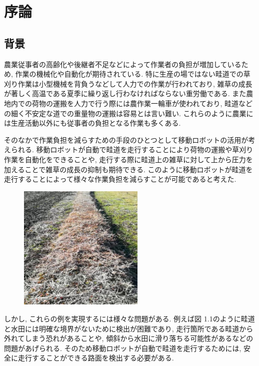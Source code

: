 \chapter{序論}
\section{背景}
農業従事者の高齢化や後継者不足などによって作業者の負担が増加しているため, 作業の機械化や自動化が期待されている. 
特に生産の場ではない畦道での草刈り作業は小型機械を背負うなどして人力での作業が行われており, 雑草の成長が著しく高温である夏季に繰り返し行わなければならない重労働である. 
また農地内での荷物の運搬を人力で行う際には農作業一輪車が使われており, 畦道などの細く不安定な道での重量物の運搬は容易とは言い難い. 
これらのように農業には生産活動以外にも従事者の負担となる作業も多くある.  

そのなかで作業負担を減らすための手段のひとつとして移動ロボットの活用が考えられる. 
移動ロボットが自動で畦道を走行することにより荷物の運搬や草刈り作業を自動化をできることや, 
走行する際に畦道上の雑草に対して上から圧力を加えることで雑草の成長の抑制も期待できる\cite{稲垣栄洋2017踏圧処理が畦畔雑草植生に及ぼす影響}. 
このように移動ロボットが畦道を走行することによって様々な作業負担を減らすことが可能であると考えた. 
\begin{figure}[htbp]
\begin{center}
\includegraphics[width=60mm]{figs/fig1.jpg}
\caption{}
\end{center}
\end{figure}

しかし, これらの例を実現するには様々な問題がある.  
例えば図 1.1のように畦道と水田には明確な境界がないために検出が困難であり, 走行箇所である畦道から外れてしまう恐れがあることや, 
傾斜から水田に滑り落ちる可能性があるなどの問題があげられる. 
そのため移動ロボットが自動で畦道を走行するためには, 安全に走行することができる路面を検出する必要がある.



